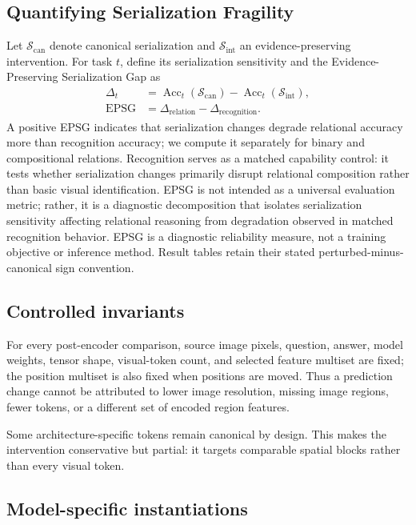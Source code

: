 \documentclass[10pt,twocolumn,letterpaper]{article}
\begin{document}
\subsection{Quantifying Serialization Fragility}

Let $\mathcal{S}_{\mathrm{can}}$ denote canonical serialization and $\mathcal{S}_{\mathrm{int}}$ an evidence-preserving intervention.
For task $t$, define its serialization sensitivity and the Evidence-Preserving Serialization Gap as
\begin{align}
    \Delta_t &= \operatorname{Acc}_t(\mathcal{S}_{\mathrm{can}})-\operatorname{Acc}_t(\mathcal{S}_{\mathrm{int}}), \\
    \mathrm{EPSG} &= \Delta_{\mathrm{relation}}-\Delta_{\mathrm{recognition}}.
\end{align}
A positive EPSG indicates that serialization changes degrade relational accuracy more than recognition accuracy; we compute it separately for binary and compositional relations.
Recognition serves as a matched capability control: it tests whether serialization changes primarily disrupt relational composition rather than basic visual identification.
EPSG is not intended as a universal evaluation metric; rather, it is a diagnostic decomposition that isolates serialization sensitivity affecting relational reasoning from degradation observed in matched recognition behavior.
EPSG is a diagnostic reliability measure, not a training objective or inference method.
Result tables retain their stated perturbed-minus-canonical sign convention.

\subsection{Controlled invariants}

For every post-encoder comparison, source image pixels, question, answer, model weights, tensor shape, visual-token count, and selected feature multiset are fixed; the position multiset is also fixed when positions are moved.
Thus a prediction change cannot be attributed to lower image resolution, missing image regions, fewer tokens, or a different set of encoded region features.

Some architecture-specific tokens remain canonical by design.
This makes the intervention conservative but partial: it targets comparable spatial blocks rather than every visual token.

\subsection{Model-specific instantiations}
\label{sec:instantiation}
\end{document}
